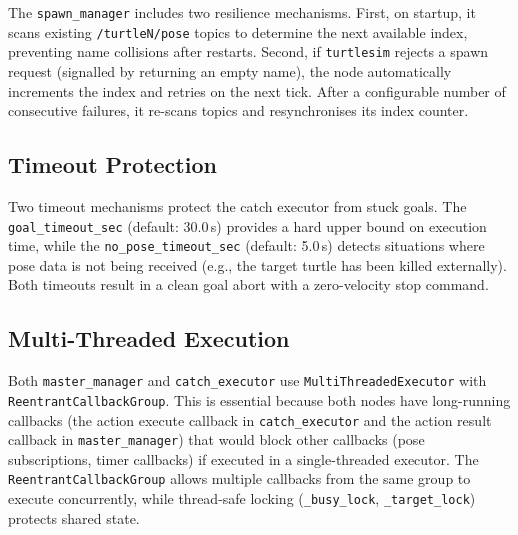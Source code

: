 The \texttt{spawn\_manager} includes two resilience mechanisms. First, on startup, it scans existing \texttt{/turtleN/pose} topics to determine the next available index, preventing name collisions after restarts. Second, if \texttt{turtlesim} rejects a spawn request (signalled by returning an empty name), the node automatically increments the index and retries on the next tick. After a configurable number of consecutive failures, it re-scans topics and resynchronises its index counter.

\subsection{Timeout Protection}

Two timeout mechanisms protect the catch executor from stuck goals. The \texttt{goal\_timeout\_sec} (default: 30.0\,s) provides a hard upper bound on execution time, while the \texttt{no\_pose\_timeout\_sec} (default: 5.0\,s) detects situations where pose data is not being received (e.g., the target turtle has been killed externally). Both timeouts result in a clean goal abort with a zero-velocity stop command.

\subsection{Multi-Threaded Execution}

Both \texttt{master\_manager} and \texttt{catch\_executor} use \texttt{MultiThreadedExecutor} with \texttt{ReentrantCallbackGroup}. This is essential because both nodes have long-running callbacks (the action execute callback in \texttt{catch\_executor} and the action result callback in \texttt{master\_manager}) that would block other callbacks (pose subscriptions, timer callbacks) if executed in a single-threaded executor. The \texttt{ReentrantCallbackGroup} allows multiple callbacks from the same group to execute concurrently, while thread-safe locking (\texttt{\_busy\_lock}, \texttt{\_target\_lock}) protects shared state.
